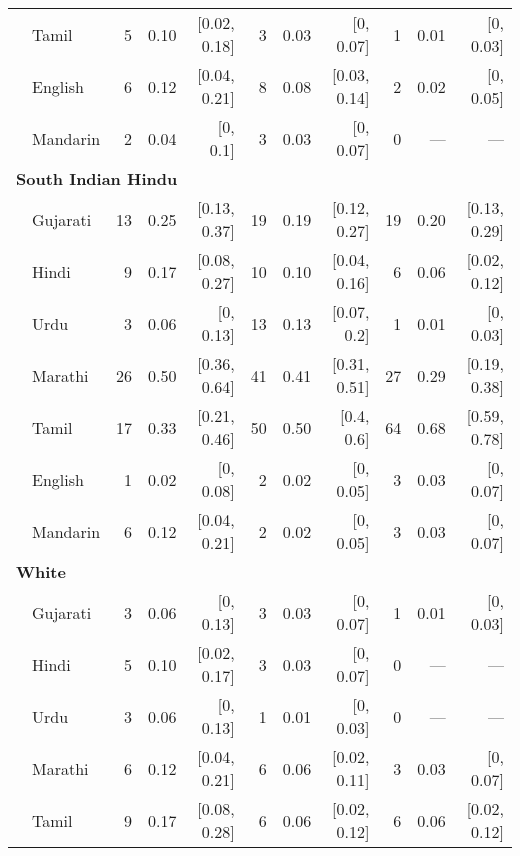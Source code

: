 \begin{table}[t]
\begin{footnotesize}
\begin{tabular}{p{.1in}lrrrrrrrrr}
 & Tamil & 5 & 0.10 & [0.02, 0.18] & 3 & 0.03 & [0, 0.07] & 1 & 0.01 & [0, 0.03]\\

 & English & 6 & 0.12 & [0.04, 0.21] & 8 & 0.08 & [0.03, 0.14] & 2 & 0.02 & [0, 0.05]\\

& Mandarin & 2 & 0.04 & [0, 0.1] & 3 & 0.03 & [0, 0.07] & 0 & --- & ---\\
\midrule
\multicolumn{11}{l}{\textbf{South Indian Hindu}}\\
& Gujarati & 13 & 0.25 & [0.13, 0.37] & 19 & 0.19 & [0.12, 0.27] & 19 & 0.20 & [0.13, 0.29]\\

 & Hindi & 9 & 0.17 & [0.08, 0.27] & 10 & 0.10 & [0.04, 0.16] & 6 & 0.06 & [0.02, 0.12]\\

 & Urdu & 3 & 0.06 & [0, 0.13] & 13 & 0.13 & [0.07, 0.2] & 1 & 0.01 & [0, 0.03]\\

 & Marathi & 26 & 0.50 & [0.36, 0.64] & 41 & 0.41 & [0.31, 0.51] & 27 & 0.29 & [0.19, 0.38]\\

 & Tamil & 17 & 0.33 & [0.21, 0.46] & 50 & 0.50 & [0.4, 0.6] & 64 & 0.68 & [0.59, 0.78]\\

 & English & 1 & 0.02 & [0, 0.08] & 2 & 0.02 & [0, 0.05] & 3 & 0.03 & [0, 0.07]\\

 & Mandarin & 6 & 0.12 & [0.04, 0.21] & 2 & 0.02 & [0, 0.05] & 3 & 0.03 & [0, 0.07]\\

\midrule
\multicolumn{11}{l}{\textbf{White}}\\
  & Gujarati & 3 & 0.06 & [0, 0.13] & 3 & 0.03 & [0, 0.07] & 1 & 0.01 & [0, 0.03]\\

 & Hindi & 5 & 0.10 & [0.02, 0.17] & 3 & 0.03 & [0, 0.07] & 0 & --- & ---\\

 & Urdu & 3 & 0.06 & [0, 0.13] & 1 & 0.01 & [0, 0.03] & 0 & --- & ---\\

 & Marathi & 6 & 0.12 & [0.04, 0.21] & 6 & 0.06 & [0.02, 0.11] & 3 & 0.03 & [0, 0.07]\\

 & Tamil & 9 & 0.17 & [0.08, 0.28] & 6 & 0.06 & [0.02, 0.12] & 6 & 0.06 & [0.02, 0.12]\\


\end{tabular}
\end{footnotesize}
\end{table}
